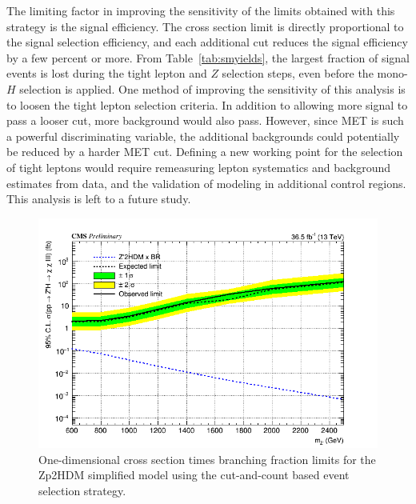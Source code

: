 The limiting factor in improving the sensitivity of the limits obtained with this strategy is the signal efficiency. The cross section limit is directly proportional to the signal selection efficiency, and each additional cut reduces the signal efficiency by a few percent or more. From Table~\ref{tab:smyields}, the largest fraction of signal events is lost during the tight lepton and $Z$ selection steps, even before the mono-$H$ selection is applied. One method of improving the sensitivity of this analysis is to loosen the tight lepton selection criteria. In addition to allowing more signal to pass a looser cut, more background would also pass. However, since MET is such a powerful discriminating variable, the additional backgrounds could potentially be reduced by a harder MET cut. Defining a new working point for the selection of tight leptons would require remeasuring lepton systematics and background estimates from data, and the validation of modeling in additional control regions. This analysis is left to a future study.

\begin{figure}[tbh]
\centering
\includegraphics[width=5in]{figures/sigma_limits_4mu_Zp2HDM.png}
\caption{One-dimensional cross section times branching fraction limits for the Zp2HDM simplified model using the cut-and-count based event selection strategy.}
\label{fig:limzp2hdm}
\end{figure}


